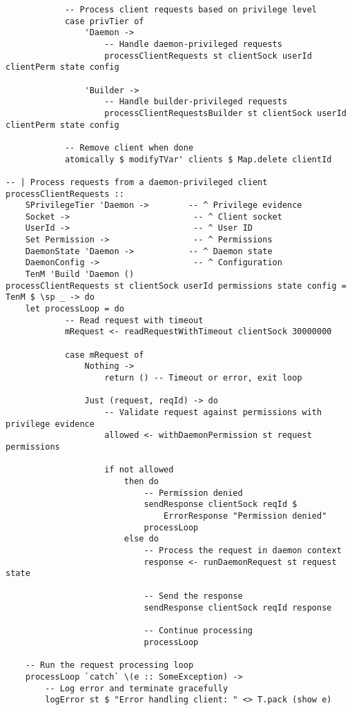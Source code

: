 \documentclass{article}
\begin{document}
\begin{tcolorbox}[title=Ten/Daemon/Server.hs Changes]
\begin{verbatim}
            -- Process client requests based on privilege level
            case privTier of
                'Daemon ->
                    -- Handle daemon-privileged requests
                    processClientRequests st clientSock userId clientPerm state config

                'Builder ->
                    -- Handle builder-privileged requests
                    processClientRequestsBuilder st clientSock userId clientPerm state config

            -- Remove client when done
            atomically $ modifyTVar' clients $ Map.delete clientId

-- | Process requests from a daemon-privileged client
processClientRequests ::
    SPrivilegeTier 'Daemon ->        -- ^ Privilege evidence
    Socket ->                         -- ^ Client socket
    UserId ->                         -- ^ User ID
    Set Permission ->                 -- ^ Permissions
    DaemonState 'Daemon ->           -- ^ Daemon state
    DaemonConfig ->                   -- ^ Configuration
    TenM 'Build 'Daemon ()
processClientRequests st clientSock userId permissions state config = TenM $ \sp _ -> do
    let processLoop = do
            -- Read request with timeout
            mRequest <- readRequestWithTimeout clientSock 30000000

            case mRequest of
                Nothing ->
                    return () -- Timeout or error, exit loop

                Just (request, reqId) -> do
                    -- Validate request against permissions with privilege evidence
                    allowed <- withDaemonPermission st request permissions

                    if not allowed
                        then do
                            -- Permission denied
                            sendResponse clientSock reqId $
                                ErrorResponse "Permission denied"
                            processLoop
                        else do
                            -- Process the request in daemon context
                            response <- runDaemonRequest st request state

                            -- Send the response
                            sendResponse clientSock reqId response

                            -- Continue processing
                            processLoop

    -- Run the request processing loop
    processLoop `catch` \(e :: SomeException) ->
        -- Log error and terminate gracefully
        logError st $ "Error handling client: " <> T.pack (show e)


\end{verbatim}
\end{tcolorbox}
\end{document}
